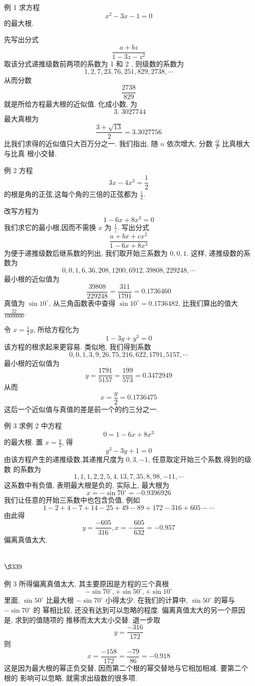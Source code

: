 例 1 求方程
\[
x^{2}-3 x-1=0
\]
的最大根.

先写出分式
\[
\frac{a+b z}{1-3 z-z^{2}}
\]
取该分式递推级数前两项的系数为 1 和 2 , 则级数的系数为
\[
1,2,7,23,76,251,829,2738, \cdots
\]
从而分数
\[
\frac{2738}{829}
\]
就是所给方程最大根的近似值. 化成小数, 为
\[
\text { 3. } 3027744
\]
最大真根为
\[
\frac{3+\sqrt{13}}{2}=3.3027756
\]
比我们求得的近似值只大百万分之一. 我们指出, 随 $n$ 依次增大, 分数 $\frac{Q}{P}$ 比真根大与比真 根小交替.

例 2 方程
\[
3 x-4 x^{3}=\frac{1}{2}
\]
的根是角的正弦,这每个角的三倍的正弦都为 $\frac{1}{2}$.

改写方程为
\[
1-6 x+8 x^{3}=0
\]
我们求它的最小根,因而不需换 $x$ 为 $\frac{1}{z}$. 写出分式
\[
\frac{a+b x+c x^{2}}{1-6 x+8 x^{3}}
\]
为便于递推级数后继系数的列出, 我们取开始三系数为 $0,0,1$. 这样, 递推级数的系数为
\[
0,0,1,6,36,208,1200,6912,39808,229248, \cdots
\]
最小根的近似值为
\[
\frac{39808}{229248}=\frac{311}{1791}=0.1736460
\]
真值为 $\sin 10^{\circ}$, 从三角函数表中查得 $\sin 10^{\circ}=0.1736482$, 比我们算出的值大 $\frac{22}{10000000}$.

令 $x=\frac{1}{2} y$, 所给方程化为
\[
1-3 y+y^{3}=0
\]
该方程的根求起来更容易. 类似地, 我们得到系数
\[
0,0,1,3,9,26,75,216,622,1791,5157, \cdots
\]
最小根的近似值为
\[
y=\frac{1791}{5157}=\frac{199}{573}=0.3472949
\]
从而
\[
x=\frac{y}{2}=0.1736475
\]
这后一个近似值与真值的差是前一个的约三分之一. 

例 3 求例 2 中方程
\[
0=1-6 x+8 x^{3}
\]
的最大根. 置 $x=\frac{y}{2}$, 得
\[
y^{3}-3 y+1=0
\]
由该方程产生的递推级数,其递推尺度为 $0,3,-1$, 任意取定开始三个系数,得到的级数 的系数为
\[
1,1,1,2,2,5,4,13,7,35,8,98,-11, \cdots
\]
这系数中有负值, 表明最大根是负的, 实际上, 最大根为
\[
x=-\sin 70^{\circ}=-0.9396926
\]
我们让任意的开始三系数中也包含负值, 例如
\[
1-2+4-7+14-25+49-89+172-316+605-\cdots
\]
由此得
\[
y=\frac{-605}{316}, x=-\frac{605}{632}=-0.957
\]
偏离真值太大.

\section{$\S 339$}

例 3 所得偏离真值太大, 其主要原因是方程的三个真根
\[
-\sin 70^{\circ},+\sin 50^{\circ},+\sin 10^{\circ}
\]
里面, $\sin 50^{\circ}$ 比最大根 $-\sin 70^{\circ}$ 小得太少. 在我们的计算中, $\sin 50^{\circ}$ 的幂与 $-\sin 70^{\circ}$ 的 幂相比较, 还没有达到可以忽略的程度. 偏离真值太大的另一个原因是, 求到的值随项的 推移而太大太小交替. 退一步取
\[
y=\frac{-316}{172}
\]
则
\[
x=\frac{-158}{172}=\frac{-79}{86}=-0.918
\]
这是因为最大根的幂正负交替, 因而第二个根的幂交替地与它相加相减. 要第二个根的 影响可以忽略, 就需求出级数的很多项.

